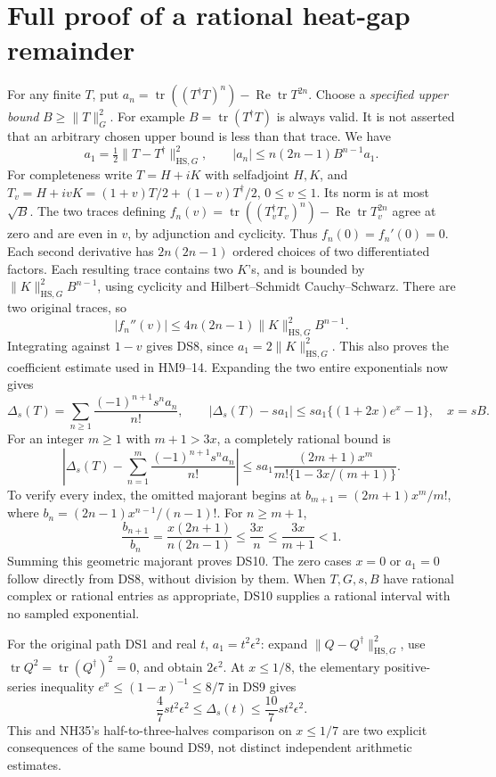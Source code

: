 \documentclass[11pt]{article}
\newcommand{\tr}{\operatorname{tr}}
\newcommand{\Rea}{\operatorname{Re}}
\begin{document}
\section{Full proof of a rational heat-gap remainder}
For any finite \(T\), put \(a_n=\tr((T^\dagger T)^n)-\Rea\tr T^{2n}\).
Choose a \emph{specified upper bound} \(B\ge\|T\|_G^2\).
For example \(B=\tr(T^\dagger T)\) is always valid. It is not asserted
that an arbitrary chosen upper bound is less than that trace.
We have
\[
 a_1=\tfrac12\|T-T^\dagger\|_{\mathrm{HS},G}^2,\qquad
 |a_n|\le n(2n-1)B^{n-1}a_1 .
 \tag{DS8}
\]
For completeness write \(T=H+iK\) with selfadjoint \(H,K\), and
\(T_v=H+ivK=(1+v)T/2+(1-v)T^\dagger/2\), \(0\le v\le1\).
Its norm is at most \(\sqrt B\).
The two traces defining
\(f_n(v)=\tr((T_v^\dagger T_v)^n)-\Rea\tr T_v^{2n}\)
agree at zero and are even in \(v\), by adjunction and cyclicity.
Thus \(f_n(0)=f_n'(0)=0\).
Each second derivative has \(2n(2n-1)\) ordered choices of two
differentiated factors. Each resulting trace contains two \(K\)'s,
and is bounded by
\(\|K\|_{\mathrm{HS},G}^2B^{n-1}\), using cyclicity and
Hilbert--Schmidt Cauchy--Schwarz. There are two original traces, so
\[
 |f_n''(v)|\le4n(2n-1)\|K\|_{\mathrm{HS},G}^2 B^{n-1}.
\]
Integrating against \(1-v\) gives DS8, since
\(a_1=2\|K\|_{\mathrm{HS},G}^2\).
This also proves the coefficient estimate used in HM9--14.
Expanding the two entire exponentials now gives
\[
 \Delta_s(T)=\sum_{n\ge1}\frac{(-1)^{n+1}s^na_n}{n!},
 \qquad
 |\Delta_s(T)-sa_1|\le sa_1\{(1+2x)e^x-1\},\quad x=sB.
 \tag{DS9}
\]
For an integer \(m\ge1\) with \(m+1>3x\), a completely rational bound is
\[
 \left|\Delta_s(T)-\sum_{n=1}^m
             \frac{(-1)^{n+1}s^na_n}{n!}\right|
 \le sa_1\frac{(2m+1)x^m}{m!\{1-3x/(m+1)\}} .
 \tag{DS10}
\]
To verify every index, the omitted majorant begins at
\(b_{m+1}=(2m+1)x^m/m!\), where
\(b_n=(2n-1)x^{n-1}/(n-1)!\).
For \(n\ge m+1\),
\[
 \frac{b_{n+1}}{b_n}
 =\frac{x(2n+1)}{n(2n-1)}
 \le\frac{3x}{n}\le\frac{3x}{m+1}<1.
\]
Summing this geometric majorant proves DS10. The zero cases \(x=0\)
or \(a_1=0\) follow directly from DS8, without division by them.
When \(T,G,s,B\) have rational complex or rational entries as appropriate,
DS10 supplies a rational interval with no sampled exponential.

For the original path DS1 and real \(t\), \(a_1=t^2\epsilon^2\):
expand \(\|Q-Q^\dagger\|_{\mathrm{HS},G}^2\), use
\(\tr Q^2=\tr(Q^\dagger)^2=0\), and obtain \(2\epsilon^2\).
At \(x\le1/8\), the elementary positive-series inequality
\(e^x\le(1-x)^{-1}\le8/7\) in DS9 gives
\[
 \frac47 st^2\epsilon^2\le\Delta_s(t)
 \le\frac{10}{7}st^2\epsilon^2 .
 \tag{DS11}
\]
This and NH35's half-to-three-halves comparison on \(x\le1/7\)
are two explicit consequences of the same bound DS9, not distinct
independent arithmetic estimates.
\end{document}
